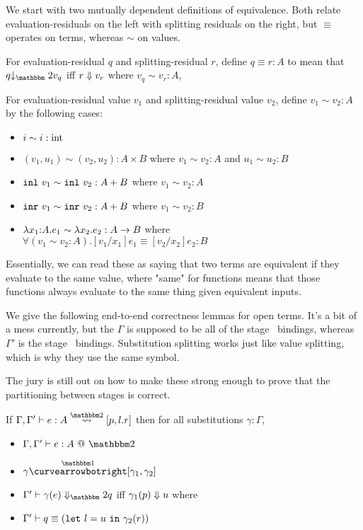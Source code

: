 We start with two mutually dependent definitions of equivalence.  
Both relate evaluation-residuals on the left with splitting residuals on the right,
but $\equiv$ operates on terms, whereas $\sim$ on values.

\begin{definition}
For evaluation-residual $q$ and splitting-residual $r$, define $q \equiv r : A$ to mean that 
$q \tworedsym v_q$ iff ${r} \Downarrow {v_r}$ where $v_q \sim v_r : A$, 
\end{definition}

\begin{definition}
For evaluation-residual value $v_1$ and splitting-residual value $v_2$, define $v_1 \sim v_2 : A$ by the following cases:
\begin{itemize}
\item $i \sim i : {\rm int}$
\item $(v_1,u_1) \sim (v_2,u_2) : A \times B$ where $v_1 \sim v_2 : A$ and $u_1 \sim u_2 : B$
\item ${\tt inl}~v_1 \sim {\tt inl}~v_2 : A + B$ where $v_1 \sim v_2 : A$
\item ${\tt inr}~v_1 \sim {\tt inr}~v_2 : A + B$ where $v_1 \sim v_2 : B$
\item $\lambda{x_1}\mathrm{:}{A}.{e_1} \sim \lambda x_2.e_2 : A \to B$ where \\ $\forall (v_1 \sim v_2 : A). [v_1/x_1]e_1 \equiv [v_2/x_2]e_2 : B$
\end{itemize}
\end{definition}

Essentially, we can read these as saying that two terms are equivalent if they evaluate to the same value,
where "same" for functions means that those functions always evaluate to the same thing given equivalent inputs.

We give the following end-to-end correctness lemmas for open terms. 
It's a bit of a mess currently, but the $\Gamma$ is supposed to be all of the stage \bbone\ bindings, 
whereas $\Gamma'$ is the stage \bbtwo\ bindings.
Substitution splitting works just like value splitting, which is why they use the same symbol.

The jury is still out on how to make these strong enough to prove that the partitioning between stages is correct.

\begin{lemma}
If $\Gamma, \Gamma'\vdash e : A \splittwosym [p,l.r]$ then for all substitutions $\gamma : \Gamma$,
\begin{itemize}
\item $\Gamma,\Gamma' \vdash e : A~@~\bbtwo$ 
\item $\gamma \vsplito [\gamma_1, \gamma_2]$
\item $\diatwo [\Gamma'] {\gamma(e)} q$ iff ${\gamma_1(p)} \Downarrow {u}$ where
\item $\Gamma' \vdash q \equiv ({\tt let}~{l} = {u}~{\tt in}~{\gamma_2(r)})$
\end{itemize}
\end{lemma}

